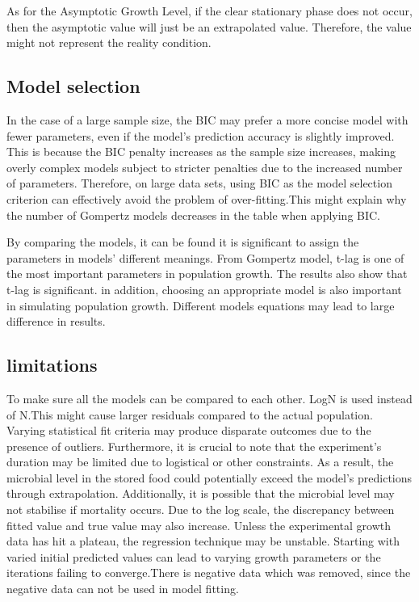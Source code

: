 \documentclass[11pt]{article}
\begin{document}
 As for the Asymptotic Growth Level, if the clear stationary phase does not occur, then the asymptotic value will just be an extrapolated value\cite{peleg2011}. Therefore, the value might not represent the reality condition. 


\subsection{Model selection}
In the case of a large sample size, the BIC may prefer a more concise model with fewer parameters, even if the model's prediction accuracy is slightly improved. This is because the BIC penalty increases as the sample size increases, making overly complex models subject to stricter penalties due to the increased number of parameters\cite{kuha2004}. Therefore, on large data sets, using BIC as the model selection criterion can effectively avoid the problem of over-fitting.This might explain why the number of Gompertz models decreases in the table when applying BIC.


By comparing the models, it can be found it is significant to assign the parameters in models’ different meanings. From Gompertz model, t-lag is one of the most important parameters in population growth. The results also show that t-lag is significant. in addition, choosing an appropriate model is also important in simulating population growth. Different models equations may lead to large difference in results. 

\subsection{limitations}
To make sure all the models can be compared to each other. LogN is used instead of N.This might cause larger residuals compared to the actual population.
Varying statistical fit criteria may produce disparate outcomes due to the presence of outliers. Furthermore, it is crucial to note that the experiment's duration may be limited due to logistical or other constraints. As a result, the microbial level in the stored food could potentially exceed the model's predictions through extrapolation. Additionally, it is possible that the microbial level may not stabilise if mortality occurs\cite{peleg2011}. 
Due to the log scale, the discrepancy between fitted value and true value may also increase. Unless the experimental growth data has hit a plateau, the regression technique may be unstable. Starting with varied initial predicted values can lead to varying growth parameters or the iterations failing to converge.There is negative data which was removed, since the negative data can not be used in model fitting.
\end{document}
